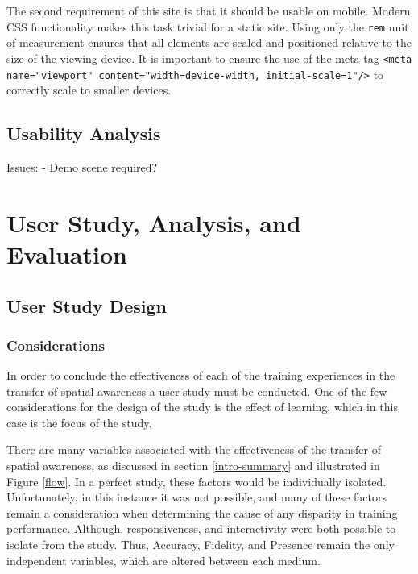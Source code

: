 \documentclass[a4paper, openright, twoside]{book}
\begin{document}
The second requirement of this site is that it should be usable on mobile. Modern CSS functionality makes this task trivial for a static site. Using only the \lstinline{rem} unit of measurement ensures that all elements are scaled and positioned relative to the size of the viewing device. It is important to ensure the use of the meta tag \lstinline{<meta name="viewport" content="width=device-width, initial-scale=1"/>} to correctly scale to smaller devices. 

\section{Usability Analysis}
Issues:
- Demo scene required?























\chapter{User Study, Analysis, and Evaluation}

\section{User Study Design}

\subsection{Considerations}
In order to conclude the effectiveness of each of the training experiences in the transfer of spatial awareness a user study must be conducted. One of the few considerations for the design of the study is the effect of learning, which in this case is the focus of the study.

There are many variables associated with the effectiveness of the transfer of spatial awareness, as discussed in section \ref{intro-summary} and illustrated in Figure \ref{flow}. In a perfect study, these factors would be individually isolated. Unfortunately, in this instance it was not possible, and many of these factors remain a consideration when determining the cause of any disparity in training performance. Although, responsiveness, and interactivity were both possible to isolate from the study. Thus, Accuracy, Fidelity, and Presence remain the only independent variables, which are altered between each medium. 
\end{document}
